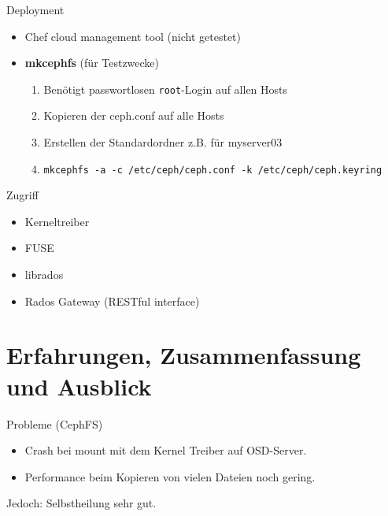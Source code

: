\documentclass[hyperref={xetex}]{beamer}
\begin{document}
\begin{frame}{Deployment}
	\begin{itemize}
		\item Chef cloud management tool (nicht getestet)
		\item \textbf{mkcephfs} (f\"ur Testzwecke)
			\begin{enumerate}
				\item Ben\"otigt passwortlosen \texttt{root}-Login auf allen Hosts
				\item Kopieren der ceph.conf auf alle Hosts
				\item Erstellen der Standardordner z.B. f\"ur myserver03
				\item \texttt{mkcephfs -a -c /etc/ceph/ceph.conf -k /etc/ceph/ceph.keyring}
			\end{enumerate}
	\end{itemize}
\end{frame}



\begin{frame}{Zugriff}
	\begin{itemize}
		\item Kerneltreiber
		\item FUSE
		\item librados
		\item Rados Gateway (RESTful interface)
	\end{itemize}
\end{frame}

\section{Erfahrungen, Zusammenfassung und Ausblick}

\begin{frame}{Probleme (CephFS)}
    \begin{itemize}
        \item Crash bei mount mit dem Kernel Treiber auf OSD-Server.
        \item Performance beim Kopieren von vielen Dateien noch gering.
    \end{itemize}
    \alert{Jedoch:} Selbstheilung sehr gut.
\end{frame}
\end{document}
